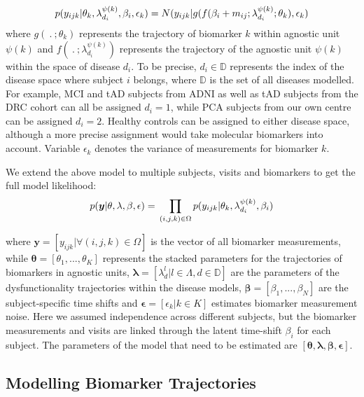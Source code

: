 \documentclass{llncs}
\begin{document}
\begin{equation}
 p(y_{ijk}|\theta_k, \lambda_{d_i}^{\psi(k)}, \beta_i, \epsilon_k) = N(y_{ijk}| g(f(\beta_i + m_{ij}; \lambda_{d_i}^{\psi(k)}; \theta_k), \epsilon_k)
\end{equation}
where $g(\ .\ ; \theta_k)$ represents the trajectory of biomarker $k$ within agnostic unit $\psi(k)$ and $f(\ .\ ; \lambda_{d_i}^{\psi(k)})$ represents the trajectory of the agnostic unit $\psi(k)$ within the space of disease $d_i$. To be precise, $d_i \in \mathbb{D}$ represents the index of the disease space where subject $i$ belongs, where $\mathbb{D}$ is the set of all diseases modelled. For example, MCI and tAD subjects from ADNI as well as tAD subjects from the DRC cohort can all be assigned $d_i=1$, while PCA subjects from our own centre can be assigned $d_i=2$. Healthy controls can be assigned to either disease space, although a more precise assignment would take molecular biomarkers into account. Variable $\epsilon_k$ denotes the variance of measurements for biomarker $k$. 

We extend the above model to multiple subjects, visits and biomarkers to get the full model likelihood:
\begin{equation}
 p(\boldsymbol{y}|\theta, \lambda, \beta , \epsilon) = \\ \prod_{(i,j,k) \in \Omega} p(y_{ijk}|\theta_k, \lambda_{d_i}^{\psi(k)}, \beta_i) 
\end{equation}

where $\boldsymbol{y} = [y_{ijk} | \forall (i,j,k) \in \Omega ]$ is the vector of all biomarker measurements, while $\boldsymbol{\theta} = [\theta_1, ..., \theta_K]$ represents the stacked parameters for the trajectories of biomarkers in agnostic units, $\boldsymbol{\lambda} = [\lambda_d^{l}|l \in \Lambda, d \in \mathbb{D}]$ are the parameters of the dysfunctionality trajectories within the disease models, $\boldsymbol{\beta} =[\beta_1, ..., \beta_N]$ are the subject-specific time shifts and $\boldsymbol{\epsilon} = [\epsilon_k | k \in K]$  estimates biomarker measurement noise. Here we assumed independence across different subjects, but the biomarker measurements and visits are linked through the latent time-shift $\beta_i$ for each subject. The parameters of the model that need to be estimated are $[\boldsymbol{\theta}, \boldsymbol{\lambda}, \boldsymbol{\beta}, \boldsymbol{\epsilon}]$.

\subsection{Modelling Biomarker Trajectories}
\label{sec:dktBiomkTraj}
\end{document}

